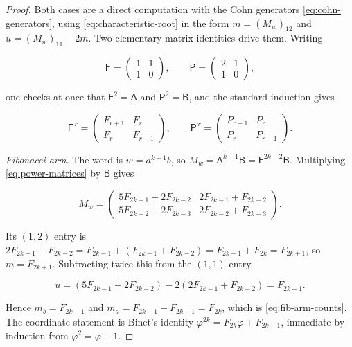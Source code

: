\begin{proof}
Both cases are a direct computation with the Cohn generators
\cref{eq:cohn-generators}, using \cref{eq:characteristic-root} in the form
$m=(M_w)_{12}$ and $u=(M_w)_{11}-2m$. Two elementary matrix identities drive
them. Writing

\begin{equation}
 \mathsf F=\begin{pmatrix}1&1\\1&0\end{pmatrix},
 \qquad
 \mathsf P=\begin{pmatrix}2&1\\1&0\end{pmatrix},
 \label{eq:fib-pell-matrices}
\end{equation}

one checks at once that $\mathsf F^2=\mathsf A$ and
$\mathsf P^2=\mathsf B$, and the standard induction gives

\begin{equation}
 \mathsf F^{\,r}=\begin{pmatrix}F_{r+1}&F_r\\F_r&F_{r-1}\end{pmatrix},
 \qquad
 \mathsf P^{\,r}=\begin{pmatrix}P_{r+1}&P_r\\P_r&P_{r-1}\end{pmatrix}.
 \label{eq:power-matrices}
\end{equation}

\emph{Fibonacci arm.} The word is $w=a^{k-1}b$, so
$M_w=\mathsf A^{k-1}\mathsf B=\mathsf F^{2k-2}\mathsf B$. Multiplying
\cref{eq:power-matrices} by $\mathsf B$ gives

\begin{equation}
 M_w=
 \begin{pmatrix}
 5F_{2k-1}+2F_{2k-2} & 2F_{2k-1}+F_{2k-2}\\
 5F_{2k-2}+2F_{2k-3} & 2F_{2k-2}+F_{2k-3}
 \end{pmatrix}.
\end{equation}

Its $(1,2)$ entry is
$2F_{2k-1}+F_{2k-2}=F_{2k-1}+(F_{2k-1}+F_{2k-2})=F_{2k-1}+F_{2k}=F_{2k+1}$,
so $m=F_{2k+1}$. Subtracting twice this from the $(1,1)$ entry,

\begin{equation}
 u=(5F_{2k-1}+2F_{2k-2})-2(2F_{2k-1}+F_{2k-2})=F_{2k-1}.
\end{equation}

Hence $m_b=F_{2k-1}$ and $m_a=F_{2k+1}-F_{2k-1}=F_{2k}$, which is
\cref{eq:fib-arm-counts}. The coordinate statement is Binet's identity
$\varphi^{2k}=F_{2k}\varphi+F_{2k-1}$, immediate by induction from
$\varphi^2=\varphi+1$.


\end{proof}
